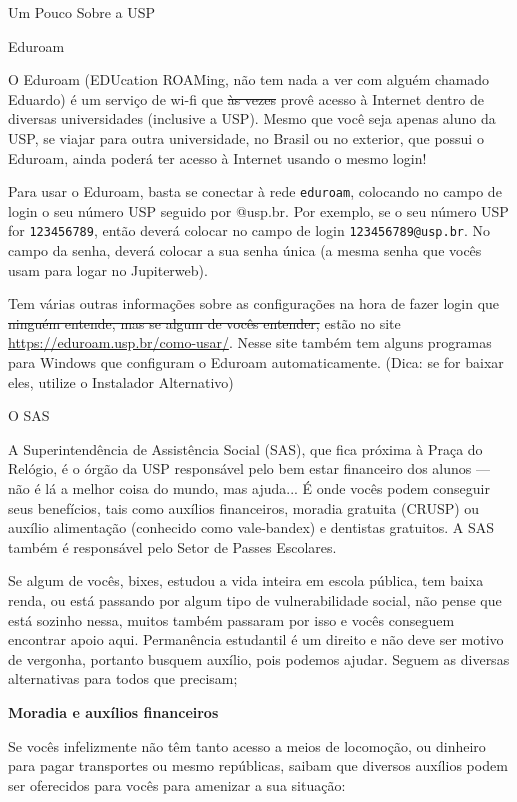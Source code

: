 \begin{secao}{Um Pouco Sobre a USP}
\begin{subsecao}{Eduroam}

O Eduroam (EDUcation ROAMing, não tem nada a ver com alguém chamado Eduardo) é um
serviço de wi-fi que \sout{às vezes} provê acesso à Internet dentro de diversas
universidades (inclusive a USP). Mesmo que você seja apenas aluno da USP, se viajar
para outra universidade, no Brasil ou no exterior, que possui o Eduroam, ainda poderá
ter acesso à Internet usando o mesmo login!

Para usar o Eduroam, basta se conectar à rede \texttt{eduroam}, colocando no campo
de login o seu número USP seguido por @usp.br. Por exemplo, se o seu número USP for
\texttt{123456789}, então deverá colocar no campo de login \texttt{123456789@usp.br}.
No campo da senha, deverá colocar a sua senha única (a mesma senha que vocês usam
para logar no Jupiterweb).

Tem várias outras informações sobre as configurações na hora de fazer login que
\sout{ninguém entende, mas se algum de vocês entender,} estão no site
\url{https://eduroam.usp.br/como-usar/}. Nesse site também tem alguns programas para Windows que 
configuram o Eduroam automaticamente. (Dica: se for baixar eles, utilize o Instalador Alternativo) %

\end{subsecao}

\begin{subsecao}{O SAS}

A Superintendência de Assistência Social (SAS), que fica próxima à Praça do
Relógio, é o órgão da USP responsável pelo bem estar financeiro dos alunos — não
é lá a melhor coisa do mundo, mas ajuda... É onde vocês podem conseguir seus
benefícios, tais como auxílios financeiros, moradia gratuita (CRUSP)
ou auxílio alimentação (conhecido como vale-bandex) e dentistas gratuitos.
A SAS também é responsável pelo Setor de Passes Escolares.

Se algum de vocês, bixes, estudou a vida inteira em escola pública, tem baixa renda,
ou está passando por algum tipo de vulnerabilidade social, não pense que está sozinho nessa,
muitos também passaram por isso e vocês conseguem encontrar apoio aqui. Permanência
estudantil é um direito e não deve ser motivo de vergonha, portanto busquem
auxílio, pois podemos ajudar. Seguem as diversas alternativas para todos 
que precisam;

\textbf{Moradia e auxílios financeiros}

Se vocês infelizmente não têm tanto acesso a meios de locomoção, ou dinheiro para
pagar transportes ou mesmo repúblicas, saibam que diversos auxílios podem ser
oferecidos para vocês para amenizar a sua situação:


\end{subsecao}
\end{secao}
